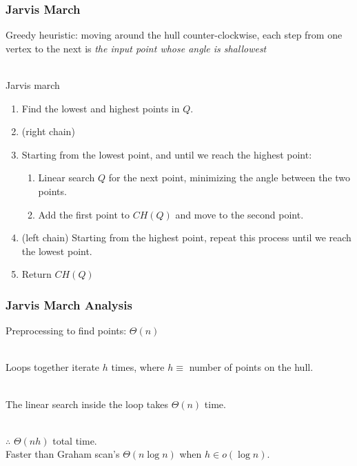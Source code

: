 \documentclass{beamer}
\newcommand{\stanza}{ \\~\ }
\begin{document}
\begin{frame} \frametitle{Jarvis March}
Greedy heuristic: moving around the hull counter-clockwise, each step from one
  vertex to the next is \emph{the input point whose angle is shallowest} \stanza

Jarvis march
\begin{enumerate}
  \item Find the lowest and highest points in $Q$.
  \item (right chain)
  \item Starting from the lowest point, and until we reach the highest point:
    \begin{enumerate}
      \item Linear search $Q$ for the next point, minimizing the angle between
        the two points.
      \item Add the first point to $CH(Q)$ and move to the second point.
    \end{enumerate}
  \item (left chain) Starting from the highest point, repeat this process until we
    reach the lowest point.
  \item Return $CH(Q)$
\end{enumerate}
\end{frame}

\begin{frame} \frametitle{Jarvis March Analysis}
  Preprocessing to find points: $\Theta(n)$ \stanza

  Loops together iterate $h$ times, where $h \equiv $ number of points on the hull. \stanza

  The linear search inside the loop takes $\Theta(n)$ time. \stanza

  $\therefore$ $\Theta(nh)$ total time. \\
  Faster than Graham scan's $\Theta(n \log n)$ when $h \in o(\log n).$
\end{frame}
\end{document}
